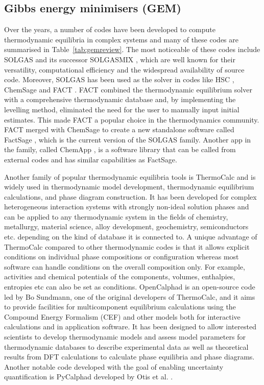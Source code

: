 \subsection{Gibbs energy minimisers (GEM)}
	Over the years, a number of codes have been developed to compute thermodynamic equilibria in complex systems and many of these codes are summarised in Table~\ref{tab:gemreview}. The most noticeable of these codes include SOLGAS \cite{Eriksson71} and its successor SOLGASMIX \cite{Eriksson:1975aa}, which are well known for their versatility, computational efficiency and the widespread availability of source code. Moreover,  SOLGAS has been used as the solver in codes like HSC \cite{HSCSoftware:aa}, ChemSage \cite{Eriksson90} and FACT \cite{Thompson83}. FACT combined the thermodynamic equilibrium solver with a comprehensive thermodynamic database and, by implementing the levelling method, eliminated the need for the user to manually input initial estimates. This made FACT a popular choice in the thermodynamics community. FACT merged with ChemSage to create a new standalone software called FactSage \cite{Bale02}, which is the current version of the SOLGAS family. Another app in the family, called ChemApp \cite{Eriksson:2008aa,Petersen:2007aa}, is a software library that can be called from external codes and has similar capabilities as FactSage.

	Another family of popular thermodynamic equilibria tools is ThermoCalc \cite{ANDERSSON2002273} and is widely used in thermodynamic model development, thermodynamic equilibrium calculations, and  phase diagram construction. It has been developed for complex heterogeneous interaction systems with strongly non-ideal solution phases and can be applied to any thermodynamic system in the fields of chemistry, metallurgy, material science, alloy development, geochemistry, semiconductors etc. depending on the kind of database it is connected to. A unique advantage of ThermoCalc compared to other thermodynamic codes is that it allows explicit conditions on individual phase compositions or configuration whereas most software can handle conditions on the overall composition only. For example, activities and chemical potentials of the components, volumes, enthalpies, entropies etc can also be set as conditions.  OpenCalphad \cite{Sundman:2015aa} is an open-source code led by Bo Sundmann, one of the original developers of ThermoCalc, and it aims to provide facilities for multicomponent equilibrium calculations using the Compound Energy Formalism (CEF) and other models both for interactive calculations and in application software. It has been designed to allow interested scientists to develop thermodynamic models and assess model parameters for thermodynamic databases to describe experimental data as well as theoretical results from DFT calculations to calculate phase equilibria and phase diagrams. Another notable code developed with the goal of enabling uncertainty quantification is PyCalphad developed by Otis et al. \cite{Otis:2017aa}.


